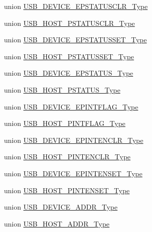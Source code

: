\begin{DoxyCompactItemize}
union \mbox{\hyperlink{union_u_s_b___d_e_v_i_c_e___e_p_s_t_a_t_u_s_c_l_r___type}{U\+S\+B\+\_\+\+D\+E\+V\+I\+C\+E\+\_\+\+E\+P\+S\+T\+A\+T\+U\+S\+C\+L\+R\+\_\+\+Type}}
\item 
union \mbox{\hyperlink{union_u_s_b___h_o_s_t___p_s_t_a_t_u_s_c_l_r___type}{U\+S\+B\+\_\+\+H\+O\+S\+T\+\_\+\+P\+S\+T\+A\+T\+U\+S\+C\+L\+R\+\_\+\+Type}}
\item 
union \mbox{\hyperlink{union_u_s_b___d_e_v_i_c_e___e_p_s_t_a_t_u_s_s_e_t___type}{U\+S\+B\+\_\+\+D\+E\+V\+I\+C\+E\+\_\+\+E\+P\+S\+T\+A\+T\+U\+S\+S\+E\+T\+\_\+\+Type}}
\item 
union \mbox{\hyperlink{union_u_s_b___h_o_s_t___p_s_t_a_t_u_s_s_e_t___type}{U\+S\+B\+\_\+\+H\+O\+S\+T\+\_\+\+P\+S\+T\+A\+T\+U\+S\+S\+E\+T\+\_\+\+Type}}
\item 
union \mbox{\hyperlink{union_u_s_b___d_e_v_i_c_e___e_p_s_t_a_t_u_s___type}{U\+S\+B\+\_\+\+D\+E\+V\+I\+C\+E\+\_\+\+E\+P\+S\+T\+A\+T\+U\+S\+\_\+\+Type}}
\item 
union \mbox{\hyperlink{union_u_s_b___h_o_s_t___p_s_t_a_t_u_s___type}{U\+S\+B\+\_\+\+H\+O\+S\+T\+\_\+\+P\+S\+T\+A\+T\+U\+S\+\_\+\+Type}}
\item 
union \mbox{\hyperlink{union_u_s_b___d_e_v_i_c_e___e_p_i_n_t_f_l_a_g___type}{U\+S\+B\+\_\+\+D\+E\+V\+I\+C\+E\+\_\+\+E\+P\+I\+N\+T\+F\+L\+A\+G\+\_\+\+Type}}
\item 
union \mbox{\hyperlink{union_u_s_b___h_o_s_t___p_i_n_t_f_l_a_g___type}{U\+S\+B\+\_\+\+H\+O\+S\+T\+\_\+\+P\+I\+N\+T\+F\+L\+A\+G\+\_\+\+Type}}
\item 
union \mbox{\hyperlink{union_u_s_b___d_e_v_i_c_e___e_p_i_n_t_e_n_c_l_r___type}{U\+S\+B\+\_\+\+D\+E\+V\+I\+C\+E\+\_\+\+E\+P\+I\+N\+T\+E\+N\+C\+L\+R\+\_\+\+Type}}
\item 
union \mbox{\hyperlink{union_u_s_b___h_o_s_t___p_i_n_t_e_n_c_l_r___type}{U\+S\+B\+\_\+\+H\+O\+S\+T\+\_\+\+P\+I\+N\+T\+E\+N\+C\+L\+R\+\_\+\+Type}}
\item 
union \mbox{\hyperlink{union_u_s_b___d_e_v_i_c_e___e_p_i_n_t_e_n_s_e_t___type}{U\+S\+B\+\_\+\+D\+E\+V\+I\+C\+E\+\_\+\+E\+P\+I\+N\+T\+E\+N\+S\+E\+T\+\_\+\+Type}}
\item 
union \mbox{\hyperlink{union_u_s_b___h_o_s_t___p_i_n_t_e_n_s_e_t___type}{U\+S\+B\+\_\+\+H\+O\+S\+T\+\_\+\+P\+I\+N\+T\+E\+N\+S\+E\+T\+\_\+\+Type}}
\item 
union \mbox{\hyperlink{union_u_s_b___d_e_v_i_c_e___a_d_d_r___type}{U\+S\+B\+\_\+\+D\+E\+V\+I\+C\+E\+\_\+\+A\+D\+D\+R\+\_\+\+Type}}
\item 
union \mbox{\hyperlink{union_u_s_b___h_o_s_t___a_d_d_r___type}{U\+S\+B\+\_\+\+H\+O\+S\+T\+\_\+\+A\+D\+D\+R\+\_\+\+Type}}

\end{DoxyCompactItemize}
